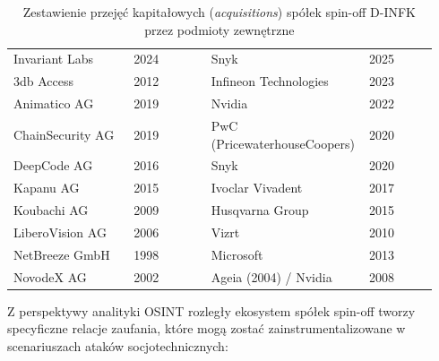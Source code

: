 \begin{table}[H]
    \centering
    \caption{Zestawienie przejęć kapitałowych (\textit{acquisitions}) spółek spin-off D-INFK przez podmioty zewnętrzne}\label{tab:spinoff-akwizycje}
    \tablefont
    \begin{tabularx}{\linewidth}{L{0.28\linewidth} C{0.18\linewidth} L{0.32\linewidth} C{0.16\linewidth}}
        \toprule
         &  &  &  \\
        \midrule
        Invariant Labs & 2024 & Snyk & 2025 \\
        3db Access & 2012 & Infineon Technologies & 2023 \\
        Animatico AG & 2019 & Nvidia & 2022 \\
        ChainSecurity AG & 2019 & PwC (PricewaterhouseCoopers) & 2020 \\
        DeepCode AG & 2016 & Snyk & 2020 \\
        Kapanu AG & 2015 & Ivoclar Vivadent & 2017 \\
        Koubachi AG & 2009 & Husqvarna Group & 2015 \\
        LiberoVision AG & 2006 & Vizrt & 2010 \\
        NetBreeze GmbH & 1998 & Microsoft & 2013 \\
        NovodeX AG & 2002 & Ageia (2004) / Nvidia & 2008 \\
        \bottomrule
    \end{tabularx}
\end{table}


Z perspektywy analityki OSINT rozległy ekosystem spółek spin-off tworzy specyficzne relacje zaufania, które mogą zostać zainstrumentalizowane w scenariuszach ataków socjotechnicznych:

